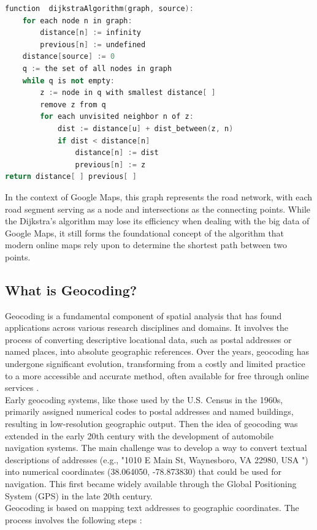 \documentclass[10pt,oneside,english,a4paper]{article}
\begin{document}
\begin{lstlisting}[language=C++, caption=Pseudo code representation, frame =single, basicstyle=\ttfamily\small]
function  dijkstraAlgorithm(graph, source):
	for each node n in graph:
		distance[n] := infinity
		previous[n] := undefined
	distance[source] := 0
	q := the set of all nodes in graph
	while q is not empty:
		z := node in q with smallest distance[ ]
		remove z from q
		for each unvisited neighbor n of z:
			dist := distance[u] + dist_between(z, n)
			if dist < distance[n]
				distance[n] := dist
				previous[n] := z
return distance[ ] previous[ ]

\end{lstlisting}
In the context of Google Maps, this graph represents the road network, with each road segment serving as a node and intersections as the connecting points. While the Dijkstra's algorithm may lose its efficiency when dealing with the big data of Google Maps, it still forms the foundational concept of the algorithm that modern online maps rely upon to determine the shortest path between two points.

\subsection{What is Geocoding?} \label{internal:geocoding}
Geocoding is a fundamental component of spatial analysis that has found applications across various research disciplines and domains. It involves the process of converting descriptive locational data, such as postal addresses or named places, into absolute geographic references. Over the years, geocoding has undergone significant evolution, transforming from a costly and limited practice to a more accessible and accurate method, often available for free through online services \cite{Goldberg2007}. 
\\Early geocoding systems, like those used by the U.S. Census in the 1960s, primarily assigned numerical codes to postal addresses and named buildings, resulting in low-resolution geographic output. Then the idea of geocoding was extended in the early 20th century with the development of automobile navigation systems. The main challenge was to develop a way to convert textual descriptions of addresses (e.g., "1010 E Main St, Waynesboro, VA 22980, USA ") into numerical coordinates (38.064050, -78.873830) that could be used for navigation. This first became widely available through the Global Positioning System (GPS) in the late 20th century.
\\Geocoding is based on mapping text addresses to geographic coordinates. The process involves the following steps \cite{Behr2010}:
\end{document}
